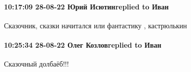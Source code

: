  
 
 
 
 

\paragraph{10:17:09 28-08-22 Юрий Исютинreplied to Иван}

Сказочник, сказки начитался или фантастику , кастрюлькин

\paragraph{10:25:34 28-08-22 Олег Козловreplied to Иван}
Сказочный долбаёб!!!
